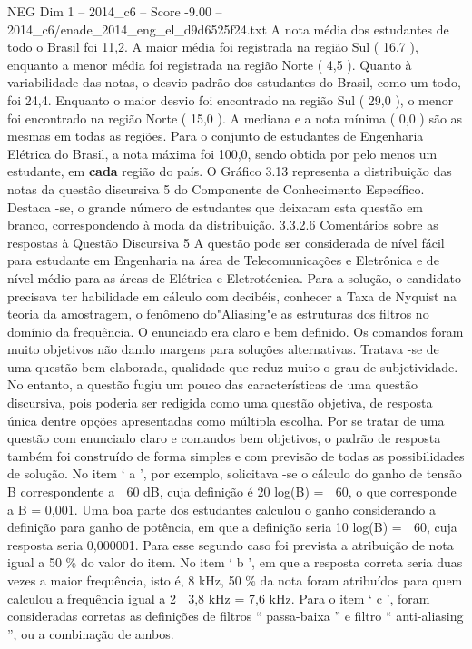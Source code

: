 \begin{textsample}{NEG Dim 1 – 2014\_c6 – Score -9.00 – 2014\_c6/enade\_2014\_eng\_el\_d9d6525f24.txt}
A nota média dos estudantes de todo o Brasil foi 11,2.
A maior média foi registrada na região Sul ( 16,7 ), enquanto a menor média foi registrada na região Norte ( 4,5 ).
Quanto à variabilidade das notas, o desvio padrão dos estudantes do Brasil, como um todo, foi 24,4.
Enquanto o maior desvio foi encontrado na região Sul ( 29,0 ), o menor foi encontrado na região Norte ( 15,0 ).
A mediana e a nota mínima ( 0,0 ) são as mesmas em todas as regiões.
Para o conjunto de estudantes de Engenharia Elétrica do Brasil, a nota máxima foi 100,0, sendo obtida por pelo menos um estudante, em \textbf{cada} região do país.
O Gráfico 3.13 representa a distribuição das notas da questão discursiva 5 do Componente de Conhecimento Específico.
Destaca -se, o grande número de estudantes que deixaram esta questão em branco, correspondendo à moda da distribuição. 3.3.2.6 Comentários sobre as respostas à Questão Discursiva 5 A questão pode ser considerada de nível fácil para estudante em Engenharia na área de Telecomunicações e Eletrônica e de nível médio para as áreas de Elétrica e Eletrotécnica.
Para a solução, o candidato precisava ter habilidade em cálculo com decibéis, conhecer a Taxa de Nyquist na teoria da amostragem, o fenômeno do"Aliasing"e as estruturas dos filtros no domínio da frequência.
O enunciado era claro e bem definido.
Os comandos foram muito objetivos não dando margens para soluções alternativas.
Tratava -se de uma questão bem elaborada, qualidade que reduz muito o grau de subjetividade.
No entanto, a questão fugiu um pouco das características de uma questão discursiva, pois poderia ser redigida como uma questão objetiva, de resposta única dentre opções apresentadas como múltipla escolha.
Por se tratar de uma questão com enunciado claro e comandos bem objetivos, o padrão de resposta também foi construído de forma simples e com previsão de todas as possibilidades de solução.
No item ‘ a ’, por exemplo, solicitava -se o cálculo do ganho de tensão B correspondente a  60 dB, cuja definição é 20 log(B) =  60, o que corresponde a B = 0,001.
Uma boa parte dos estudantes calculou o ganho considerando a definição para ganho de potência, em que a definição seria 10 log(B) =  60, cuja resposta seria 0,000001.
Para esse segundo caso foi prevista a atribuição de nota igual a 50 \% do valor do item.
No item ‘ b ’, em que a resposta correta seria duas vezes a maior frequência, isto é, 8 kHz, 50 \% da nota foram atribuídos para quem calculou a frequência igual a 2  3,8 kHz = 7,6 kHz.
Para o item ‘ c ’, foram consideradas corretas as definições de filtros “ passa-baixa ” e filtro “ anti-aliasing ”, ou a combinação de ambos.

\end{textsample}
